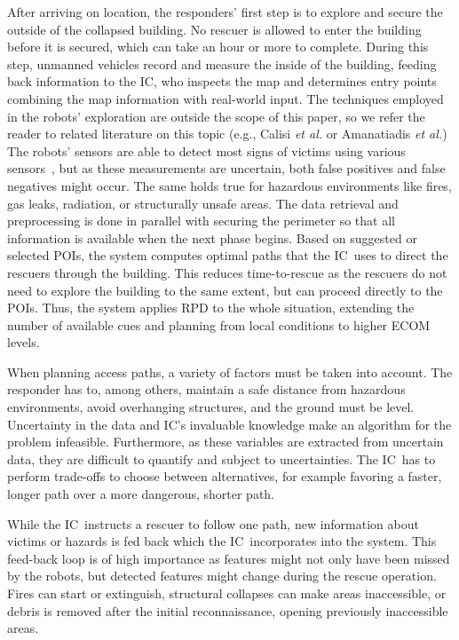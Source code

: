 \documentclass[conference,10pt,letter]{IEEEtran}
\def\IC{IC}
\def\etal{\textit{et al.}}
\begin{document}
After arriving on location, the responders' first step is to explore and secure the outside of the collapsed building. No rescuer is allowed to enter the building before it is secured, which can take an hour or more to complete. During this step, unmanned vehicles record and measure the inside of the building, feeding back information to the \IC , who inspects the map and determines entry points combining the map information with real-world input. The techniques employed in the robots' exploration are outside the scope of this paper, so we refer the reader to related literature on this topic (e.g., Calisi \etal\cite{Calisi:2007ha} or Amanatiadis \etal\cite{Amanatiadis:iq})  The robots' sensors are able to detect most signs of victims using various sensors~\cite{Wu12Eulerian}, but as these measurements are uncertain, both false positives and false negatives might occur. The same holds true for hazardous environments like fires, gas leaks, radiation, or structurally unsafe areas. The data retrieval and preprocessing is done in parallel with securing the perimeter so that all information is available when the next phase begins. Based on suggested or selected POIs, the system computes optimal paths that the \IC\ uses to direct the rescuers through the building. This reduces time-to-rescue as the rescuers do not need to explore the building to the same extent, but can proceed directly to the POIs. Thus, the system applies RPD to the whole situation, extending the number of available cues and planning from local conditions to higher ECOM levels.

When planning access paths, a variety of factors must be taken into account. The responder has to, among others, maintain a safe distance from hazardous environments, avoid overhanging structures, and the ground must be level. Uncertainty in the data and \IC 's invaluable knowledge make an algorithm for the problem infeasible. Furthermore, as these variables are extracted from uncertain data, they are difficult to quantify and subject to uncertainties. The \IC\ has to perform trade-offs to choose between alternatives, for example favoring a faster, longer path over a more dangerous, shorter path.

While the \IC\ instructs a rescuer to follow one path, new information about victims or hazards is fed back which the \IC\ incorporates into the system. This feed-back loop is of high importance as features might not only have been missed by the robots, but detected features might change during the rescue operation. Fires can start or extinguish, structural collapses can make areas inaccessible, or debris is removed after the initial reconnaissance, opening previously inaccessible areas. 
\end{document}
